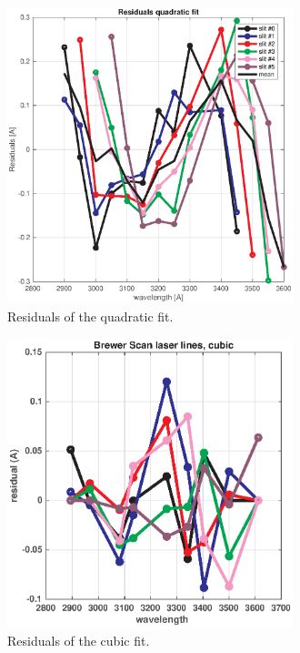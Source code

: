 \documentclass[acp]{copernicus} %
\begin{document}
\clearpage

\begin{figure}[t]
\includegraphics[width=8.3cm]{figures/General_DSP_QUAD_RES.eps}
\caption{ Residuals of the quadratic fit.}
\label{fig:dsp_residual_quad}
\end{figure}

\clearpage
\begin{figure}[t]
\includegraphics[width=8.3cm]{figures/General_brewer_scan_cubic_residual.eps}
\caption{ Residuals of the cubic fit.}
\label{fig:dsp_residual_cubic}
\end{figure}

\end{document}
